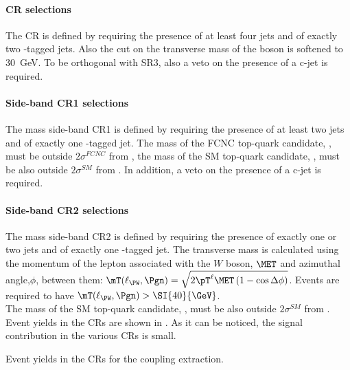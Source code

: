 \paragraph{\ttZ CR selections}
\label{sec:bkg:ttz}
The \ttZ CR is defined by requiring the presence of at least four jets
and of exactly two \Pqb-tagged jets. Also the cut on the transverse
mass of the \PW boson is softened to \SI{30}{\GeV}. To be orthogonal 
with SR3, also a veto on the presence of a c-jet is required. 

\paragraph{Side-band CR1 selections}
\label{sec:bkg:sbcr1tzu}
The mass side-band CR1 is defined by requiring the presence of at least two jets
and of exactly one \Pqb-tagged jet.
The mass of the FCNC top-quark candidate, \mtopfcnc,
must be outside $2\sigma^{FCNC}$ from \mtopvalue, the mass of the
SM top-quark candidate, \mtopsm, must be also outside $2\sigma^{SM}$
from \mtopvalue.  In addition, a veto on the presence of a c-jet is required. 

\paragraph{Side-band CR2 selections}
\label{sec:bkg:sbcr2}
The mass side-band CR2 is defined by requiring the presence of exactly one or two jets
and of exactly one \Pqb-tagged jet.   The transverse mass is calculated using the momentum of the lepton associated with the $W$ boson, $\MET$ and azimuthal angle,$\phi$, between them: 
$\mT(\ell_{\PW},\Pgn) = \sqrt{2\pT^{\ell}\MET \left(1-\cos\Delta\phi\right)}$.
Events are required to have $\mT(\ell_{\PW},\Pgn) > \SI{40}{\GeV}$.\\
The mass of the SM top-quark candidate, \mtopsm, must be also outside $2\sigma^{SM}$
from \mtopvalue.\\
Event yields in the CRs are shown in . 
As it can be noticed, the signal contribution in the various CRs is small.
\begin{table}[htbp]
	\small
	\caption{Event yields in the CRs for the \tZc coupling extraction. \TabErrStatSys} 
	\label{tab:bkg:yields:tzc}
	\centering
	
\end{table} 

